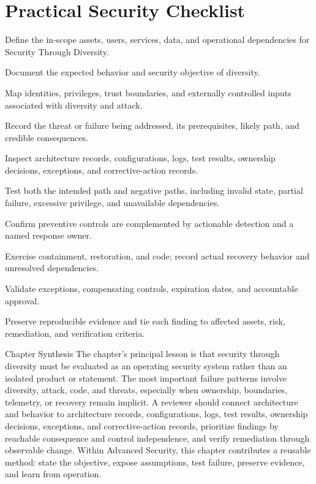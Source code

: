 \documentclass[11pt,letterpaper]{article}
\begin{document}
\section*{Practical Security Checklist}
\begin{CornellChecklist}
\item Define the in-scope assets, users, services, data, and operational dependencies for Security Through Diversity.
\item Document the expected behavior and security objective of diversity.
\item Map identities, privileges, trust boundaries, and externally controlled inputs associated with diversity and attack.
\item Record the threat or failure being addressed, its prerequisites, likely path, and credible consequences.
\item Inspect architecture records, configurations, logs, test results, ownership decisions, exceptions, and corrective-action records.
\item Test both the intended path and negative paths, including invalid state, partial failure, excessive privilege, and unavailable dependencies.
\item Confirm preventive controls are complemented by actionable detection and a named response owner.
\item Exercise containment, restoration, and code; record actual recovery behavior and unresolved dependencies.
\item Validate exceptions, compensating controls, expiration dates, and accountable approval.
\item Preserve reproducible evidence and tie each finding to affected assets, risk, remediation, and verification criteria.
\end{CornellChecklist}
\begin{CornellSummaryBox}{Chapter Synthesis}
The chapter's principal lesson is that security through diversity must be evaluated as an operating security system rather than an isolated product or statement. The most important failure patterns involve diversity, attack, code, and threats, especially when ownership, boundaries, telemetry, or recovery remain implicit. A reviewer should connect architecture and behavior to architecture records, configurations, logs, test results, ownership decisions, exceptions, and corrective-action records, prioritize findings by reachable consequence and control independence, and verify remediation through observable change. Within Advanced Security, this chapter contributes a reusable method: state the objective, expose assumptions, test failure, preserve evidence, and learn from operation.
\end{CornellSummaryBox}
\end{document}
